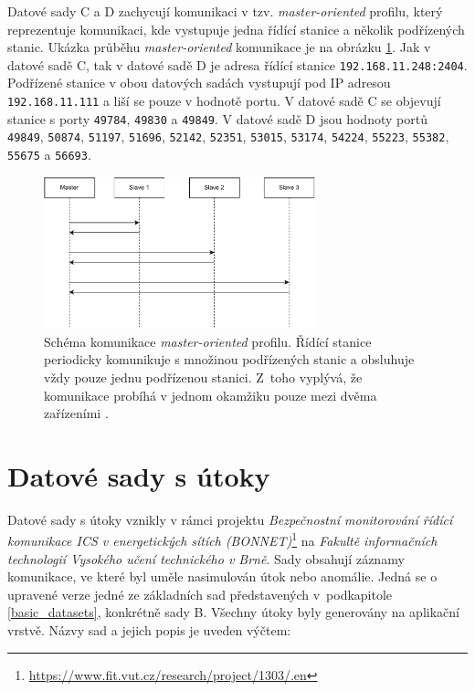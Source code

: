 Datové sady C a D zachycují komunikaci v tzv. \emph{master-oriented} profilu, který reprezentuje komunikaci, kde vystupuje jedna řídící stanice a několik podřízených stanic. Ukázka průběhu \emph{master-oriented} komunikace je na obrázku \ref{master-oriented}. Jak v datové sadě C, tak v datové sadě D je adresa řídící stanice \texttt{192.168.11.248:2404}. Podřízené stanice v obou datových sadách vystupují pod IP adresou \texttt{192.168.11.111} a liší se pouze v hodnotě portu. V datové sadě C se objevují stanice s porty \texttt{49784}, \texttt{49830} a \texttt{49849}. V datové sadě D jsou hodnoty portů \texttt{49849}, \texttt{50874}, \texttt{51197}, \texttt{51696}, \texttt{52142}, \texttt{52351}, \texttt{53015}, \texttt{53174}, \texttt{54224}, \texttt{55223}, \texttt{55382}, \texttt{55675} a \texttt{56693}.


\begin{figure}[h]
	\centering
	\includegraphics[width=0.7\textwidth]{obrazky-figures/master-oriented.pdf}
	\caption{Schéma komunikace \emph{master-oriented} profilu. Řídící stanice periodicky komunikuje s množinou podřízených stanic a obsluhuje vždy pouze jednu podřízenou stanici. Z~toho vyplývá, že komunikace probíhá v jednom okamžiku pouze mezi dvěma zařízeními \cite{anomaly_detection_ics}.}
	\label{master-oriented}
\end{figure}




\section{Datové sady s útoky}
\label{attack_datasets}

Datové sady s útoky vznikly v rámci projektu \emph{Bezpečnostní monitorování řídící komunikace ICS v energetických sítích (BONNET)}\footnote{\url{https://www.fit.vut.cz/research/project/1303/.en}} na \emph{Fakultě informačních technologií Vysokého učení technického v Brně}. Sady obsahují záznamy komunikace, ve které byl uměle nasimulován útok nebo anomálie. Jedná se o upravené verze jedné ze základních sad představených v~podkapitole \ref{basic_datasets}, konkrétně sady B. Všechny útoky byly generovány na aplikační vrstvě. Názvy sad a jejich popis je uveden výčtem:

